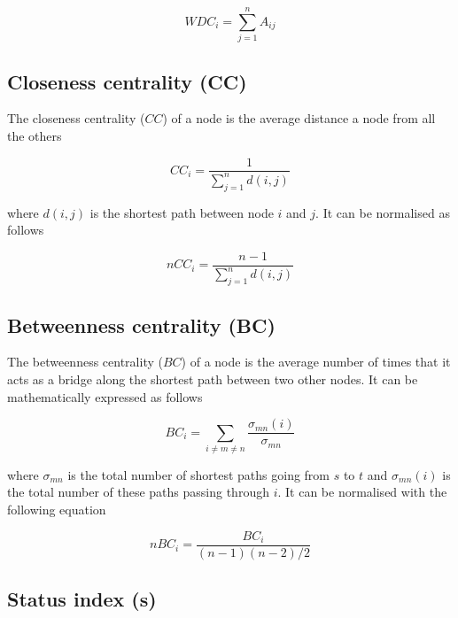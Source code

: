 					\begin{equation}
								WDC_i=\sum_{j=1}^{n}A_{ij}
					\end{equation}

	\subsection*{Closeness centrality (CC)}

		The closeness centrality ($CC$) of a node is the average distance a node from all the others \citep{Wasserman1994}

					\begin{equation}
								CC_i=\frac{1}{\sum\limits_{j=1}^n d(i,j)}
					\end{equation}

		\noindent where $d(i,j)$ is the shortest path between node $i$ and $j$. It can be normalised as follows \citep{Wasserman1994}

					\begin{equation}
								nCC_i=\frac{n-1}{\sum\limits_{j=1}^n d(i,j)}
					\end{equation}

	\subsection*{Betweenness centrality (BC)}

		The betweenness centrality ($BC$) of a node is the average number of times that it acts as a bridge along the shortest path between two other nodes. It can be  mathematically expressed as follows \citep{Wasserman1994}

						\begin{equation}
							BC_i=\sum_{i\neq m\neq n}\frac{\sigma_{mn}\left(i\right)}{\sigma_{mn}}
						\end{equation}

		\noindent where $\sigma_{mn}$ is the total number of shortest paths going from $s$ to $t$ and $\sigma_{mn}\left(i\right)$ is the total number of these paths passing through $i$. It can be normalised with the following equation \citep{Wasserman1994}

						\begin{equation}
							nBC_i=\frac{BC_i}{\left(n-1\right)\left(n-2\right)/2}
						\end{equation}

	\subsection*{Status index (s)}

